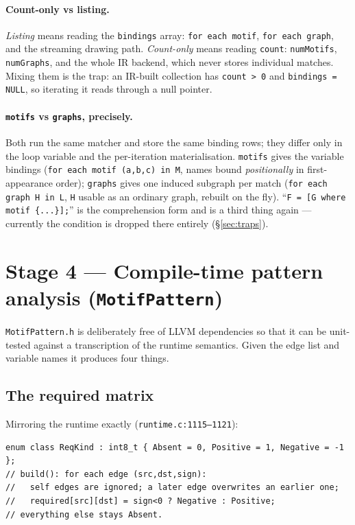 \documentclass[11pt,a4paper]{article}
\newcommand{\code}[1]{\texttt{#1}}
\newcommand{\file}[1]{\texttt{#1}}
\begin{document}
\paragraph{Count-only vs listing.} \emph{Listing} means reading the \code{bindings}
array: \code{for each motif}, \code{for each graph}, and the streaming drawing
path. \emph{Count-only} means reading \code{count}: \code{numMotifs},
\code{numGraphs}, and the whole IR backend, which never stores individual matches.
Mixing them is the trap: an IR-built collection has \code{count > 0} and
\code{bindings = NULL}, so iterating it reads through a null pointer.

\paragraph{\code{motifs} vs \code{graphs}, precisely.} Both run the same matcher
and store the same binding rows; they differ only in the loop variable and the
per-iteration materialisation. \code{motifs} gives the variable bindings
(\code{for each motif (a,b,c) in M}, names bound \emph{positionally} in
first-appearance order); \code{graphs} gives one induced subgraph per match
(\code{for each graph H in L}, \code{H} usable as an ordinary graph, rebuilt on
the fly). ``\code{F = [G where motif \{...\}];}'' is the comprehension form and is
a third thing again --- currently the condition is dropped there entirely
(\S\ref{sec:traps}).

\section{Stage 4 --- Compile-time pattern analysis (\file{MotifPattern})}

\file{MotifPattern.h} is deliberately free of LLVM dependencies so that it can be
unit-tested against a transcription of the runtime semantics. Given the edge list
and variable names it produces four things.

\subsection{The required matrix}

Mirroring the runtime exactly (\file{runtime.c:1115--1121}):

\begin{lstlisting}[style=cpp]
enum class ReqKind : int8_t { Absent = 0, Positive = 1, Negative = -1 };
// build(): for each edge (src,dst,sign):
//   self edges are ignored; a later edge overwrites an earlier one;
//   required[src][dst] = sign<0 ? Negative : Positive;
// everything else stays Absent.
\end{lstlisting}
\end{document}
